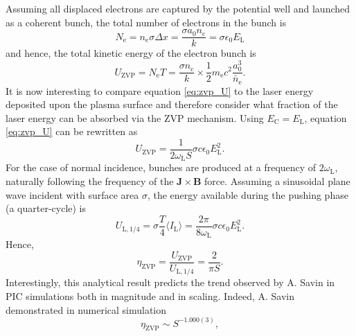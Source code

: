 Assuming all displaced electrons are captured by the potential well and launched as a coherent bunch, the total number of electrons in the bunch is
\begin{equation}\label{eq:zvp-Ne}
	N_\mathrm{e} = n_\mathrm{e} \sigma \Delta x = \frac{\sigma a_0 n_\mathrm{c}}{k}  = \sigma \epsilon_0 E_\mathrm{L}
\end{equation}
and hence, the total kinetic energy of the electron bunch is
\begin{equation}\label{eq:zvp_U}
	U_\mathrm{ZVP} = N_\mathrm{e} T = \frac{\sigma n_\mathrm{c}}{k}\times \frac{1}{2}m_\mathrm{e}c^2 \frac{a^3_0}{\bar{n}_\mathrm{e}}.
\end{equation}
It is now interesting to compare equation \ref{eq:zvp_U} to the laser energy deposited upon the plasma surface and therefore consider what fraction of the laser energy can be absorbed via the \ac{ZVP} mechanism. Using $E_\mathrm{C} = E_\mathrm{L}$, equation \ref{eq:zvp_U} can be rewritten as
\begin{equation}
	U_\mathrm{ZVP} = \frac{1}{2\omega_\mathrm{L} S}\sigma c \epsilon_0 E^2_\mathrm{L}.
\end{equation}
For the case of normal incidence, bunches are produced at a frequency of $2\omega_\mathrm{L}$, naturally following the frequency of the $\mathbf{J}\times \mathbf{B}$ force. Assuming a sinusoidal plane wave incident with surface area $\sigma$, the energy available during the pushing phase (a quarter-cycle) is
\begin{equation}
	 U_\mathrm{L,1/4} = \sigma \frac{T}{4}\langle I_\mathrm{L}\rangle = \frac{2\pi}{8\omega_\mathrm{L}}\sigma c\epsilon_0E^2_\mathrm{L}.
\end{equation}
Hence,
\begin{equation}
	\eta_\mathrm{ZVP} = \frac{U_\mathrm{ZVP}}{U_\mathrm{L,1/4}} = \frac{2}{\pi S}.
\end{equation}
Interestingly, this analytical result predicts the trend observed by A. Savin \cite{savinModellingLaserPlasmaInteractions2019} in \ac{PIC} simulations both in magnitude and in scaling. Indeed, A. Savin demonstrated in numerical simulation
\begin{equation}
	\eta_\mathrm{ZVP} \sim S^{-1.000(3)},
\end{equation}
